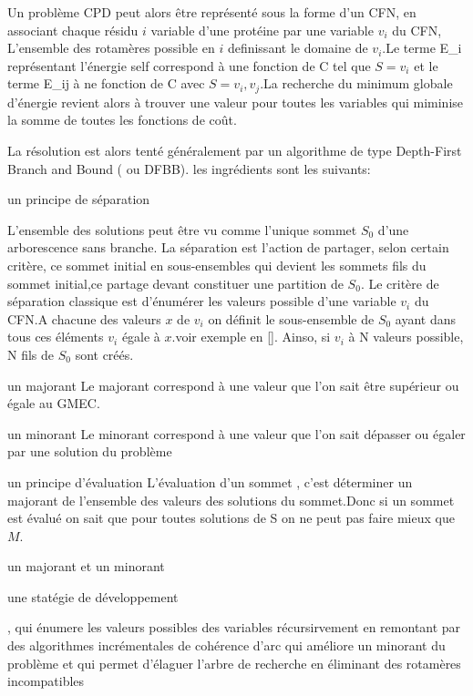 Un problème CPD peut alors être représenté sous la forme d'un CFN, en associant chaque résidu $i$ variable d'une protéine par une variable $v_i$ du CFN, L'ensemble des rotamères possible en $i$ definissant le domaine de $v_i$.Le terme E_i représentant l'énergie \og self \fg correspond à une fonction de C tel que $S={v_i}$ et le terme E_{ij} à ne fonction de C avec $S={v_i,v_j}$.La recherche du minimum globale d'énergie revient alors à trouver une valeur pour toutes les variables qui miminise la somme de toutes les fonctions de coût.
  
La résolution est alors tenté généralement par un algorithme de type  \og Depth-First Branch and Bound \fg ( ou DFBB).
les ingrédients sont les suivants:
\begin{enumeration}
\item un principe de séparation

L'ensemble des solutions peut être vu comme l'unique sommet $S_0$ d'une arborescence sans branche.  
La séparation est l'action de partager, selon certain critère, ce sommet initial en sous-ensembles  qui devient les sommets fils du sommet initial,ce partage devant constituer une partition de $S_0$.
Le critère de séparation classique est d'énumérer les valeurs possible d'une variable $v_i$ du  CFN.A chacune des valeurs $x$ de $v_i$ on définit le sous-ensemble de $S_0$ ayant dans tous ces éléments $v_i$ égale à $x$.voir exemple en \ref{}. Ainso, si $v_i$ à N valeurs possible, N fils de $S_0$ sont créés.
\item un majorant
  Le majorant correspond à une valeur que l'on sait être supérieur ou égale au GMEC.
\item un minorant
Le minorant correspond à une valeur que l'on sait dépasser ou égaler par une solution du problème  
\item un principe d'évaluation
L'évaluation d'un sommet , c'est déterminer un majorant de l'ensemble des valeurs des solutions du sommet.Donc si un sommet est évalué on sait que pour toutes solutions de S on ne peut pas faire mieux que $M$. 

  
\item un majorant et un minorant
\item une statégie de développement  
\end{enumeration}  




, qui énumere les valeurs possibles des variables récursirvement en remontant par des algorithmes incrémentales de cohérence d'arc qui améliore  un minorant du problème et qui permet d'élaguer l'arbre de recherche en éliminant des rotamères incompatibles




